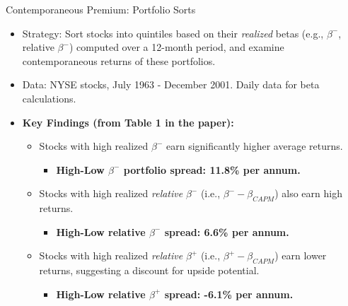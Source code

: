\documentclass[10pt]{beamer}
\begin{document}
\begin{frame}{Contemporaneous Premium: Portfolio Sorts}
    \begin{itemize}
        \item Strategy: Sort stocks into quintiles based on their \textit{realized} betas (e.g., $\beta^{-}$, relative $\beta^{-}$) computed over a 12-month period, and examine contemporaneous returns of these portfolios.
        \item Data: NYSE stocks, July 1963 - December 2001. Daily data for beta calculations.
        \item \textbf{Key Findings (from Table 1 in the paper):}
        \begin{itemize}
            \item Stocks with high realized $\beta^{-}$ earn significantly higher average returns.
                \begin{itemize}
                    \item \textbf{High-Low $\beta^{-}$ portfolio spread: 11.8\% per annum.}
                \end{itemize}
            \item Stocks with high realized \textit{relative} $\beta^{-}$ (i.e., $\beta^{-} - \beta_{CAPM}$) also earn high returns.
                 \begin{itemize}
                    \item \textbf{High-Low relative $\beta^{-}$ spread: 6.6\% per annum.}
                \end{itemize}
            \item Stocks with high realized \textit{relative} $\beta^{+}$ (i.e., $\beta^{+} - \beta_{CAPM}$) earn lower returns, suggesting a discount for upside potential.
                \begin{itemize}
                    \item \textbf{High-Low relative $\beta^{+}$ spread: -6.1\% per annum.}
                \end{itemize}
        \end{itemize}
    \end{itemize}  
\end{frame}
\end{document}
